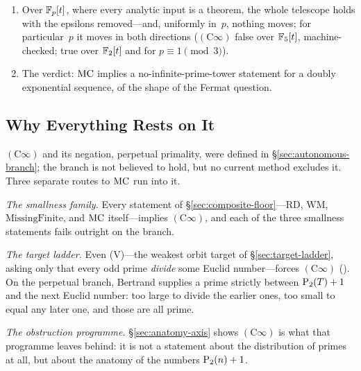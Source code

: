 \begin{roadmap}
\begin{enumerate}[nosep,leftmargin=*]
  supply---is free.  The residual gap is disjoint from it.
\item[\S\ref{sec:ff-telescope}] Over $\mathbb{F}_p[t]$, where every analytic input
  is a theorem, the whole telescope holds with the epsilons removed---and,
  uniformly in~$p$, nothing moves; for particular~$p$ it moves in both
  directions ($(\mathrm{C}\infty)$ false over $\mathbb{F}_5[t]$, machine-checked;
  true over $\mathbb{F}_2[t]$ and for $p \equiv 1 \pmod 3$).
\item[\S\ref{sec:cinfty-verdict}] The verdict: $\mathrm{MC}$ implies a
  no-infinite-prime-tower statement for a doubly exponential sequence,
  of the shape of the Fermat question.
\end{enumerate}
\end{roadmap}

\subsection{Why Everything Rests on It}
\label{sec:cinfty-beneath}

$(\mathrm{C}\infty)$ and its negation, perpetual primality, were defined in
\S\ref{sec:autonomous-branch}; the branch is not believed to hold, but no
current method excludes it.  Three separate routes to $\mathrm{MC}$ run into it.

\emph{The smallness family.}  Every statement of
\S\ref{sec:composite-floor}---$\mathrm{RD}$, $\mathrm{WM}$,
$\mathrm{MissingFinite}$, and $\mathrm{MC}$ itself---implies $(\mathrm{C}\infty)$,
and each of the three smallness statements fails outright on the branch.

\emph{The target ladder.}  Even (V)---the weakest orbit target of
\S\ref{sec:target-ladder}, asking only that every odd prime \emph{divide}
some Euclid number---forces $(\mathrm{C}\infty)$
().
On the perpetual branch, Bertrand supplies a prime strictly between
$\mathrm{P}_{2}(T)+1$ and the next Euclid number: too large to divide the earlier
ones, too small to equal any later one, and those are all prime.

\emph{The obstruction programme.}  \S\ref{sec:anatomy-axis} shows
$(\mathrm{C}\infty)$ is what that programme leaves behind: it is not a
statement about the distribution of primes at all, but about the anatomy of
the numbers $\mathrm{P}_{2}(n)+1$.

